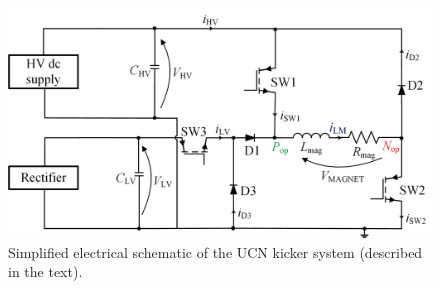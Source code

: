 \documentclass[aps,prab,twocolumn,superscriptaddress]{revtex4-1}
\begin{document}
\begin{figure}[t]
	\includegraphics[width=\linewidth]{PowerSupplySchematic3.jpg}
	\caption{Simplified electrical schematic of the UCN kicker system (described in the text).}
	\label{fig:powersupply}
\end{figure}
\end{document}
